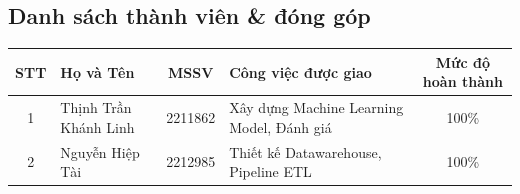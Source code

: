 \documentclass[a4paper]{article}
\theoremstyle{definition}
\begin{document}

\subsection*{Danh sách thành viên \& đóng góp}

\begin{center}
	\begin{tabularx}{\textwidth}{c l c X c}
		\toprule
		\textbf{STT} & \textbf{Họ và Tên} & \textbf{MSSV} & \textbf{Công việc được giao} & \textbf{Mức độ hoàn thành} \\
		\midrule
		1 & Thịnh Trần Khánh Linh & 2211862 &
		Xây dựng Machine Learning Model, Đánh giá &
		100\% \\
		
		2 & Nguyễn Hiệp Tài & 2212985 &
		Thiết kế Datawarehouse, Pipeline ETL & 
		100\% \\
		\bottomrule
	\end{tabularx}

\end{center}


\newpage
\tableofcontents
\newpage
\listoffigures
\newpage
\listoftables
\newpage
\setcounter{page}{1}


\newpage

\newpage

\newpage

\newpage

\newpage

\newpage

\newpage

% 
\end{document}
